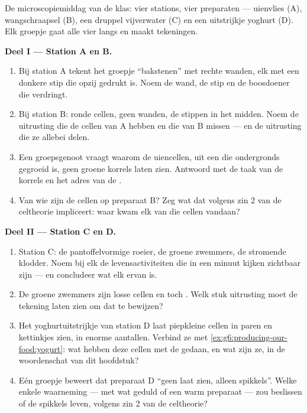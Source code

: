 \begin{problem}\label{pb:g6:cell-unit-of-life:1}
De microscopiemiddag van de klas: vier stations, vier preparaten ---
uienvlies (A), wangschraapsel (B), een druppel vijverwater (C) en een
uitstrijkje yoghurt (D). Elk groepje gaat alle vier langs en maakt
tekeningen.

\medskip\noindent\textbf{Deel I --- Station A en B.}
\begin{enumerate}
  \item Bij station A tekent het groepje ``bakstenen'' met rechte wanden,
        elk met een donkere stip die opzij gedrukt is. Noem de wand, de
        stip en de boosdoener die verdringt.
  \item Bij station B: ronde cellen, geen wanden, de stippen in het
        midden. Noem de uitrusting die de cellen van A hebben en die van
        B missen --- en de uitrusting die ze allebei delen.
  \item Een groepsgenoot vraagt waarom de uiencellen, uit een  die
        ondergronds gegroeid is, geen groene korrels laten zien. Antwoord
        met de taak van de korrels en het adres van de .
  \item Van wie zijn de cellen op preparaat B? Zeg wat dat volgens zin 2
        van de celtheorie impliceert: waar kwam elk van die cellen
        vandaan?
\end{enumerate}

\medskip\noindent\textbf{Deel II --- Station C en D.}
\begin{enumerate}[resume]
  \item Station C: de pantoffelvormige roeier, de groene zwemmers, de
        stromende klodder. Noem bij elk de levensactiviteiten die in een
        minuut kijken zichtbaar zijn --- en concludeer wat elk ervan is.
  \item De groene zwemmers zijn losse cellen en toch . Welk
        stuk uitrusting moet de tekening laten zien om dat te bewijzen?
  \item Het yoghurtuitstrijkje van station D laat piepkleine cellen in
        paren en kettinkjes zien, in enorme aantallen. Verbind ze met
        \cref{ex:g6:producing-our-food:yogurt}: wat hebben deze cellen
        met de  gedaan, en wat zijn ze, in de woordenschat van dit
        hoofdstuk?
  \item Eén groepje beweert dat preparaat D ``geen  laat
        zien, alleen spikkels''. Welke enkele waarneming --- met wat
        geduld of een warm preparaat --- zou beslissen of de spikkels
        leven, volgens zin 2 van de celtheorie?
\end{enumerate}


\end{problem}
